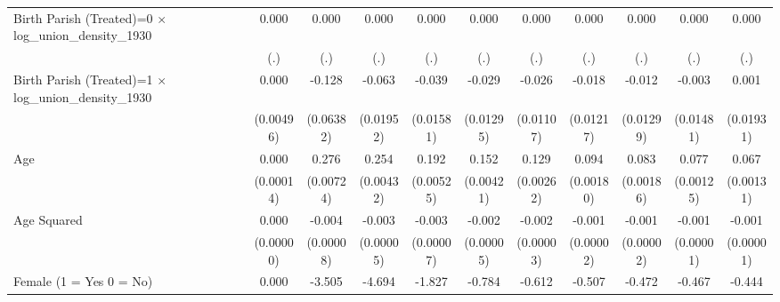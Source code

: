 {\begin{tabular}{l*{10}{c}}
Birth Parish (Treated)=0 $\times$ log\_union\_density\_1930&       0.000         &       0.000         &       0.000         &       0.000         &       0.000         &       0.000         &       0.000         &       0.000         &       0.000         &       0.000         \\
                    &         (.)         &         (.)         &         (.)         &         (.)         &         (.)         &         (.)         &         (.)         &         (.)         &         (.)         &         (.)         \\
Birth Parish (Treated)=1 $\times$ log\_union\_density\_1930&       0.000         &      -0.128\sym{*}  &      -0.063\sym{**} &      -0.039\sym{*}  &      -0.029\sym{*}  &      -0.026\sym{*}  &      -0.018         &      -0.012         &      -0.003         &       0.001         \\
                    &   (0.00496)         &   (0.06382)         &   (0.01952)         &   (0.01581)         &   (0.01295)         &   (0.01107)         &   (0.01217)         &   (0.01299)         &   (0.01481)         &   (0.01931)         \\
Age                 &       0.000         &       0.276\sym{***}&       0.254\sym{***}&       0.192\sym{***}&       0.152\sym{***}&       0.129\sym{***}&       0.094\sym{***}&       0.083\sym{***}&       0.077\sym{***}&       0.067\sym{***}\\
                    &   (0.00014)         &   (0.00724)         &   (0.00432)         &   (0.00525)         &   (0.00421)         &   (0.00262)         &   (0.00180)         &   (0.00186)         &   (0.00125)         &   (0.00131)         \\
Age Squared         &       0.000         &      -0.004\sym{***}&      -0.003\sym{***}&      -0.003\sym{***}&      -0.002\sym{***}&      -0.002\sym{***}&      -0.001\sym{***}&      -0.001\sym{***}&      -0.001\sym{***}&      -0.001\sym{***}\\
                    &   (0.00000)         &   (0.00008)         &   (0.00005)         &   (0.00007)         &   (0.00005)         &   (0.00003)         &   (0.00002)         &   (0.00002)         &   (0.00001)         &   (0.00001)         \\
Female (1 = Yes 0 = No)&       0.000         &      -3.505\sym{***}&      -4.694\sym{***}&      -1.827\sym{***}&      -0.784\sym{***}&      -0.612\sym{***}&      -0.507\sym{***}&      -0.472\sym{***}&      -0.467\sym{***}&      -0.444\sym{***}\\

\end{tabular}}
